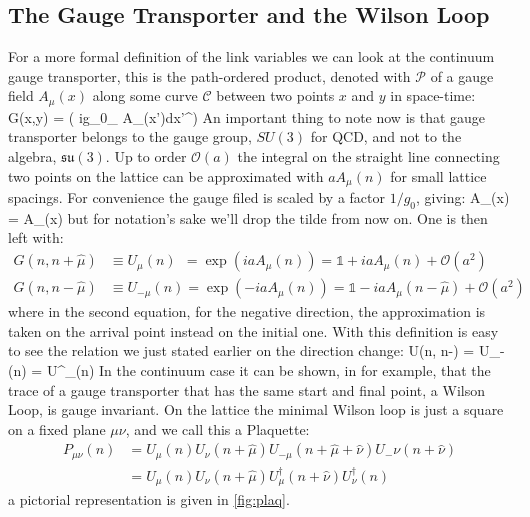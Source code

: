 \subsection{The Gauge Transporter and the Wilson Loop}
For a more formal definition of the link variables we can look at the continuum gauge transporter, this is the path-ordered product, denoted with $\mathcal{P}$ of a gauge field $A_\mu(x)$ along some curve $\mathcal{C}$ between two points $x$ and $y$ in space-time:
\beq
    G(x,y) =  \exp\left( ig_0\int_ A_\mu(x')dx'^\mu  \right)
\eeq
An important thing to note now is that gauge transporter belongs to the gauge group, $SU(3)$ for QCD, and not to the algebra, $\mathfrak{su}(3)$. 
Up to order $\mathcal{O}(a)$ the integral on the straight line connecting two points on the lattice can be approximated with $aA_\mu(n)$ for small lattice spacings. For convenience the gauge filed is scaled by a factor $1/g_0$, giving: 
\beq
\tilde A_\mu(x) =  A_\mu(x)
\label{eq:fieldscale}
\eeq
but for notation's sake we'll drop the tilde from now on. One is then left with:
\begin{align}
    G(n,n+\hat\mu) &\equiv U_\mu(n) ~~= \exp(iaA_\mu(n)) = \mathds{1} + iaA_\mu(n) + \mathcal{O}(a^2) \label{eq:transporter}\\\nonumber
    G(n,n-\hat\mu) &\equiv U_{-\mu}(n) = \exp(-iaA_\mu(n)) = \mathds{1} - iaA_\mu(n-\hat\mu) + \mathcal{O}(a^2)
\end{align}
where in the second equation, for the negative direction, the approximation is taken on the arrival point instead on the initial one. With this definition is easy to see the relation we just stated earlier on the direction change:
\beq
    U(n, n-\hat\mu) = U_{-\mu}(n) = U^\dagger_\mu(n)
\eeq
In the continuum case it can be shown, in \cite{peskin} for example, that the trace of a gauge transporter that has the same start and final point, a Wilson Loop, is gauge invariant. On the lattice the minimal Wilson loop is just a square on a fixed plane $\mu\nu$, and we call this a Plaquette:
\begin{align}
    \label{plaquette}
P_{\mu\nu}(n) &= U_\mu(n) U_\nu(n+\hat\mu) U_{-\mu}(n+\hat\mu+\hat\nu) U_-{\nu}(n+\hat\nu)  \\\nonumber
              &= U_\mu(n) U_\nu(n+\hat\mu) U^\dagger_\mu(n+\hat\nu) U^\dagger_\nu(n)
\end{align}
a pictorial representation is given in \cref{fig:plaq}.
